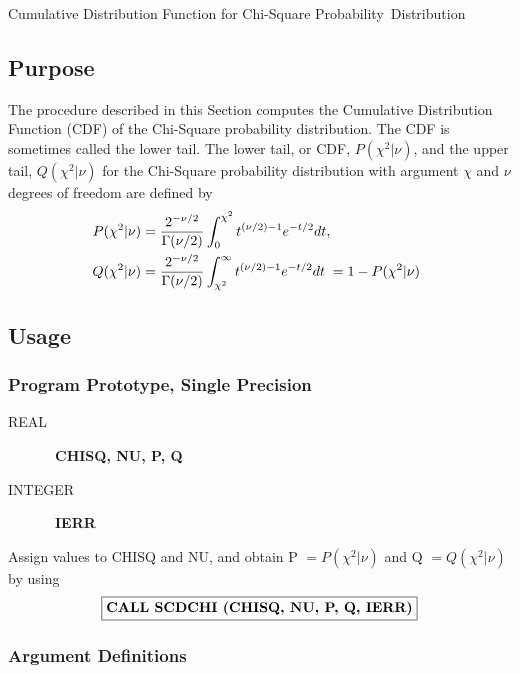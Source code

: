 \documentclass[twoside]{MATH77}
\begin{document}
 Cumulative Distribution Function for Chi-Square
\hbox{Probability Distribution}


\subsection{Purpose}

The procedure described in this Section computes the Cumulative Distribution
Function (CDF) of the Chi-Square probability distribution. The CDF is
sometimes called the lower tail. The
lower tail, or CDF, $P(\chi ^2|\nu )$, and the upper tail, $Q(\chi ^2|\nu )$
for the Chi-Square probability distribution with argument $\chi $ and $\nu $
degrees of freedom are defined by%
\begin{gather*}
\hspace{-5pt}P(\chi ^2|\nu )=\frac{2^{-\nu /2}}{\Gamma (\nu /2)}\int_0^{
\chi^2}t^{(\nu / 2)-1}e^{-t/2}dt,\phantom{=1-P(\chi ^2|\nu )}\\
\hspace{-5pt}Q(\chi ^2|\nu )=\frac{2^{-\nu /2}}{\Gamma (\nu /2)}
\int_{\chi ^2}^\infty t^{(\nu / 2)-1}e^{-t/2}dt\phantom{,}=1-P(\chi ^2|\nu )
\end{gather*}
\subsection{Usage}

\subsubsection{Program Prototype, Single Precision}

\begin{description}
\item[REAL]  \ {\bf CHISQ, NU, P, Q}

\item[INTEGER]  \ {\bf IERR}
\end{description}

Assign values to CHISQ and NU, and obtain P $=P(\chi ^2|\nu )$ and Q $%
=Q(\chi ^2|\nu )$ by using
$$
\fbox{{\bf CALL SCDCHI (CHISQ, NU, P, Q, IERR)}}
$$

\subsubsection{Argument Definitions}
\end{document}
